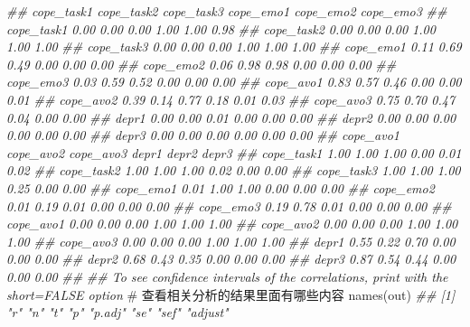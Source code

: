 \documentclass[
  chinese-hans,
  letterpaper,
  DIV=11,
  numbers=noendperiod]{scrartcl}
\newenvironment{Shaded}{\begin{snugshade}}{\end{snugshade}}
\newcommand{\CommentTok}[1]{\textcolor[rgb]{0.37,0.37,0.37}{#1}}
\newcommand{\DocumentationTok}[1]{\textcolor[rgb]{0.37,0.37,0.37}{\textit{#1}}}
\newcommand{\FunctionTok}[1]{\textcolor[rgb]{0.28,0.35,0.67}{#1}}
\newcommand{\NormalTok}[1]{\textcolor[rgb]{0.00,0.23,0.31}{#1}}
\begin{document}
\begin{Shaded}
\begin{Highlighting}[numbers=left,,]
\DocumentationTok{\#\#            cope\_task1 cope\_task2 cope\_task3 cope\_emo1 cope\_emo2 cope\_emo3}
\DocumentationTok{\#\# cope\_task1       0.00       0.00       0.00      1.00      1.00      0.98}
\DocumentationTok{\#\# cope\_task2       0.00       0.00       0.00      1.00      1.00      1.00}
\DocumentationTok{\#\# cope\_task3       0.00       0.00       0.00      1.00      1.00      1.00}
\DocumentationTok{\#\# cope\_emo1        0.11       0.69       0.49      0.00      0.00      0.00}
\DocumentationTok{\#\# cope\_emo2        0.06       0.98       0.98      0.00      0.00      0.00}
\DocumentationTok{\#\# cope\_emo3        0.03       0.59       0.52      0.00      0.00      0.00}
\DocumentationTok{\#\# cope\_avo1        0.83       0.57       0.46      0.00      0.00      0.01}
\DocumentationTok{\#\# cope\_avo2        0.39       0.14       0.77      0.18      0.01      0.03}
\DocumentationTok{\#\# cope\_avo3        0.75       0.70       0.47      0.04      0.00      0.00}
\DocumentationTok{\#\# depr1            0.00       0.00       0.01      0.00      0.00      0.00}
\DocumentationTok{\#\# depr2            0.00       0.00       0.00      0.00      0.00      0.00}
\DocumentationTok{\#\# depr3            0.00       0.00       0.00      0.00      0.00      0.00}
\DocumentationTok{\#\#            cope\_avo1 cope\_avo2 cope\_avo3 depr1 depr2 depr3}
\DocumentationTok{\#\# cope\_task1      1.00      1.00      1.00  0.00  0.01  0.02}
\DocumentationTok{\#\# cope\_task2      1.00      1.00      1.00  0.02  0.00  0.00}
\DocumentationTok{\#\# cope\_task3      1.00      1.00      1.00  0.25  0.00  0.00}
\DocumentationTok{\#\# cope\_emo1       0.01      1.00      1.00  0.00  0.00  0.00}
\DocumentationTok{\#\# cope\_emo2       0.01      0.19      0.01  0.00  0.00  0.00}
\DocumentationTok{\#\# cope\_emo3       0.19      0.78      0.01  0.00  0.00  0.00}
\DocumentationTok{\#\# cope\_avo1       0.00      0.00      0.00  1.00  1.00  1.00}
\DocumentationTok{\#\# cope\_avo2       0.00      0.00      0.00  1.00  1.00  1.00}
\DocumentationTok{\#\# cope\_avo3       0.00      0.00      0.00  1.00  1.00  1.00}
\DocumentationTok{\#\# depr1           0.55      0.22      0.70  0.00  0.00  0.00}
\DocumentationTok{\#\# depr2           0.68      0.43      0.35  0.00  0.00  0.00}
\DocumentationTok{\#\# depr3           0.87      0.54      0.44  0.00  0.00  0.00}
\DocumentationTok{\#\# }
\DocumentationTok{\#\#  To see confidence intervals of the correlations, print with the short=FALSE option}
\CommentTok{\# 查看相关分析的结果里面有哪些内容}
\FunctionTok{names}\NormalTok{(out)}
\DocumentationTok{\#\#  [1] "r"      "n"      "t"      "p"      "p.adj"  "se"     "sef"    "adjust"}

\end{Highlighting}
\end{Shaded}
\end{document}
